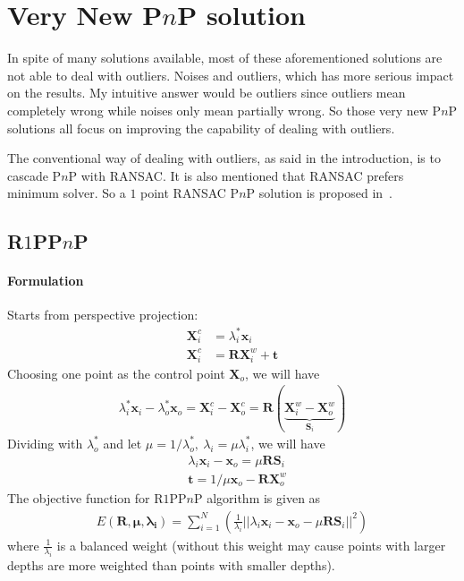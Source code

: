 \documentclass[a4paper]{report}
\begin{document}
\section{Very New P$n$P solution}
In spite of many solutions available, most of these aforementioned solutions are not able to deal with outliers. Noises and outliers, which has more serious impact on the results. My intuitive answer would be outliers since outliers mean completely wrong while noises only mean partially wrong. So those very new P$n$P solutions all focus on improving the capability of dealing with outliers. 

The conventional way of dealing with outliers, as said in the introduction, is to cascade P$n$P with RANSAC. It is also mentioned that RANSAC prefers minimum solver. So a $1$ point RANSAC P$n$P  solution is proposed in~\cite{8470970}.

\subsection{R$1$PP$n$P}
\paragraph{Formulation}
Starts from perspective projection:
\begin{align*}
	\mathbf{X}_i^{c}&=\lambda_i^* \mathbf{x}_i \\
	\mathbf{X}_i^{c}&= \mathbf{R}\mathbf{X}_i^{w}+\mathbf{t}
\end{align*}
Choosing one point as the control point $\mathbf{X}_o$, we will have
\begin{align*}
\lambda_i^* \mathbf{x}_i - \lambda_o^* \mathbf{x}_o = 
\mathbf{X}_i^{c}-\mathbf{X}_o^{c}= \mathbf{R}(\underbrace{\mathbf{X}_i^{w}-\mathbf{X}_o^{w}}_{\mathbf{S}_i})
\end{align*}
Dividing with $\lambda_o^*$ and let $\mu=1/\lambda_o^*,\ \lambda_i=\mu\lambda_i^*$, we will have
\begin{align*}
&\lambda_i \mathbf{x}_i - \mathbf{x}_o=\mu \mathbf{RS}_i \\
&\mathbf{t}=1/\mu \mathbf{x}_o-\mathbf{RX}_o^{w}
\end{align*}
The objective function for R$1$PP$n$P algorithm is given as
\begin{align*}
E(\mathbf{R,\mu,\lambda_i})=\sum_{i=1}^{N}\left(
\frac{1}{\lambda_i}||\lambda_i \mathbf{x}_i - \mathbf{x}_o-\mu \mathbf{RS}_i ||^2
\right)
\end{align*}
where $\frac{1}{\lambda_i}$ is a balanced weight (without this weight may cause points with larger depths are more weighted than points with smaller depths). 
\end{document}
